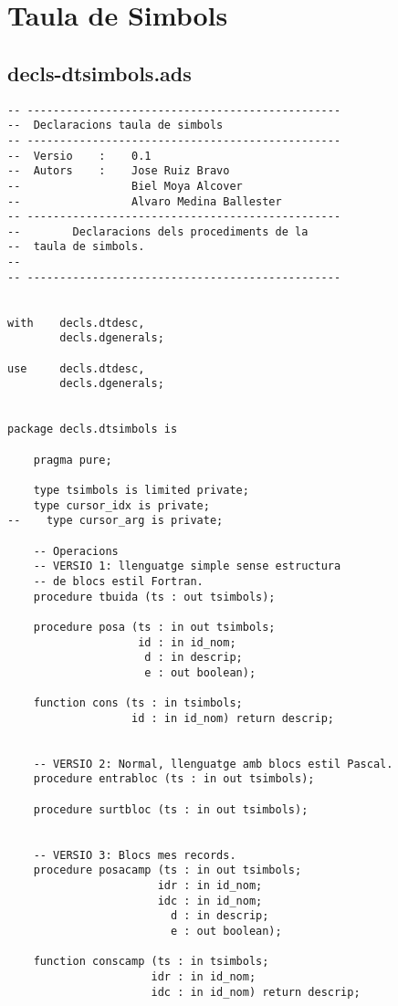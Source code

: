 \documentclass[10pt]{report}
\begin{document}
    
    \section{Taula de Simbols}
    \subsection{decls-dtsimbols.ads}
    \begin{lstlisting}[style=Ada]
-- ------------------------------------------------
--  Declaracions taula de simbols
-- ------------------------------------------------
--  Versio    :    0.1
--  Autors    :    Jose Ruiz Bravo
--                 Biel Moya Alcover
--                 Alvaro Medina Ballester
-- ------------------------------------------------
--        Declaracions dels procediments de la
--  taula de simbols.
--
-- ------------------------------------------------


with    decls.dtdesc,
        decls.dgenerals;
        
use     decls.dtdesc,
        decls.dgenerals;


package decls.dtsimbols is

    pragma pure;

    type tsimbols is limited private;
    type cursor_idx is private;
--    type cursor_arg is private;
    
    -- Operacions
    -- VERSIO 1: llenguatge simple sense estructura 
    -- de blocs estil Fortran.
    procedure tbuida (ts : out tsimbols);
    
    procedure posa (ts : in out tsimbols;
                    id : in id_nom;
                     d : in descrip;
                     e : out boolean);
                     
    function cons (ts : in tsimbols;
                   id : in id_nom) return descrip;
                    
                    
    -- VERSIO 2: Normal, llenguatge amb blocs estil Pascal.
    procedure entrabloc (ts : in out tsimbols);
    
    procedure surtbloc (ts : in out tsimbols);
    
    
    -- VERSIO 3: Blocs mes records.
    procedure posacamp (ts : in out tsimbols;
                       idr : in id_nom;
                       idc : in id_nom;
                         d : in descrip;
                         e : out boolean);
                        
    function conscamp (ts : in tsimbols;
                      idr : in id_nom;
                      idc : in id_nom) return descrip;
                       

\end{lstlisting}
\end{document}
